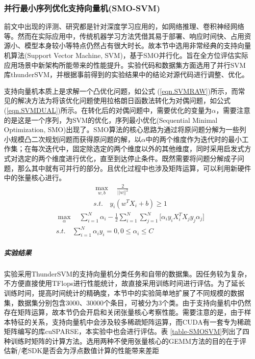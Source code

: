 \subsubsection{并行最小序列优化支持向量机(SMO-SVM)}
\par 前文中出现的评测、研究都是针对深度学习应用的，如网络推理、卷积神经网络等。然而在实际应用中，传统机器学习方法凭借其易于部署、响应时间快、占用资源小、模型本身较小等特点仍然占有很大时长。故本节中选用非常经典的支持向量机算法(Support Vector Machine, SVM)，基于SMO并行化。旨在全方位评估实际应用场景中新架构所能带来的性能提升。实验代码和数据集方面选用了并行SVM库thunderSVM，并根据事前得到的实验结果中的结论对源代码进行调整、优化。
\par 支持向量机本质上是求解一个凸优化问题，如公式 (\ref{eqn.SVMRAW})所示，而常见的解决方法为将该优化问题使用拉格朗日函数法转化为对偶问题，如公式 (\ref{eqn.SVMDUAL})所示。在转化后的对偶问题中，需要优化的变量为$ \alpha $，需要注意的是这是一个序列，为SVM的优化，序列最小优化(Sequential Minimal Optimization, SMO)出现了\cite{SMO}。SMO算法的核心思路为通过将原问题分解为一些列小规模凸二次规划问题而获得原问题的解，以$ \alpha $中的两个维度作为迭代时的最小工作集；在每次迭代中，固定除选定的两个维度以外的其他维度，同时采用启发式方式对选定的两个维度进行优化，直至到达停止条件。既然需要将问题分解成子问题，那么其中就有可并行的部分。且优化过程中也涉及矩阵运算，可以利用新硬件中的张量核心进行。
\begin{equation}
\begin{aligned}
&\max_{w, b} \quad \frac{2}{||w||^2} \\
&s.t.\quad y_{i}(w^{T}X_{i}+b) \geq 1
\end{aligned}
\label{eqn.SVMRAW}
\end{equation}
\begin{equation}
\begin{aligned}
&\max_{\alpha} \quad \sum_{i=1}^{N}\alpha_{i} - \frac{1}{2}\sum_{i=1}^{N}\sum_{j=1}^{N}\lbrack \alpha_{i}y_{i}X_{i}^{T}X_{j}y_{j}\alpha_{j} \rbrack \\
&s.t.\quad \sum_{i=1}^{N}\alpha_{i}y_{i}=0, 0 \leq \alpha_{i} \leq C
\end{aligned}
\label{eqn.SVMDUAL}
\end{equation}
\subparagraph{实验结果}
\par 实验采用ThunderSVM的支持向量机分类任务和自带的数据集。因任务较为复杂，不方便直接使用TFlops进行性能统计，故直接采用训练时间进行评估。为了延长训练时间，提高时间统计的精确度，本节中的实验简单地扩展了不同规模的数据集，数据集分别包含3000、30000个条目，可被分为3个类。由于支持向量机中仍然存在矩阵运算，故本节仍会开启和关闭张量核心考察性能。需要注意的是，由于样本特征的关系，支持向量机中会涉及较多稀疏矩阵运算，而CUDA有一套专为稀疏矩阵编写的库cuSPARSE，本实验中也会进行评估。表 \ref{table-SMOSVM}列出了四种训练时矩阵的计算方法。选用两种不使用张量核心的GEMM方法的目的在于评估新/老SDK是否会为浮点数值计算的性能带来差距
